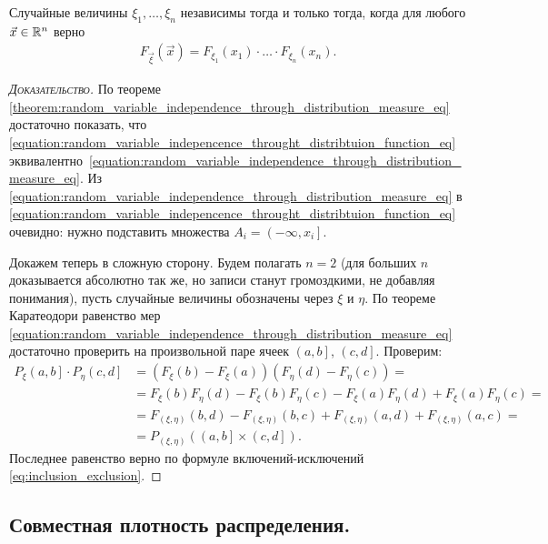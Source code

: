 \documentclass[../main.tex]{subfiles}
\begin{document}
\begin{crly}
 \label{corollary:inpendence_joint_F}
 Случайные величины $ \xi_1, \ldots, \xi_n $ независимы тогда и только тогда, когда для любого $ \vec x \in \mathbb{R}^{n} $ верно
 \begin{align}
  \label{equation:random_variable_indepencence_throught_distribtuion_function_eq}
  F_{\vec\xi}(\vec x) = F_{\xi_1}(x_1) \cdot\ldots\cdot F_{\xi_n}(x_n).
 \end{align} 
\end{crly}
\begin{proof}[\normalfont\textsc{Доказательство}]
 По теореме \ref{theorem:random_variable_independence_through_distribution_measure_eq} достаточно показать, что \eqref{equation:random_variable_indepencence_throught_distribtuion_function_eq} эквивалентно~\eqref{equation:random_variable_independence_through_distribution_measure_eq}. Из \eqref{equation:random_variable_independence_through_distribution_measure_eq} в \eqref{equation:random_variable_indepencence_throught_distribtuion_function_eq} очевидно: нужно подставить множества $ A_i = \left(-\infty, x_i\right]   $.

 Докажем теперь в сложную сторону. Будем полагать $ n = 2 $ (для больших $ n $ доказывается абсолютно так же, но записи станут громоздкими, не добавляя понимания), пусть случайные величины обозначены через $ \xi $ и $ \eta $. По теореме Каратеодори равенство мер \eqref{equation:random_variable_independence_through_distribution_measure_eq} достаточно проверить на произвольной паре ячеек $ \left(a, b\right]   $, $ \left(c, d\right] $. Проверим:
 \begin{align*}
  P_\xi \left(a, b\right] \cdot P_\eta \left(c, d\right] &= \left( F_\xi(b) - F_\xi(a) \right) \left( F_\eta(d) - F_\eta(c)  \right) = \\
  &= F_\xi(b)F_\eta(d) - F_\xi(b) F_\eta(c) - F_\xi(a) F_\eta(d) + F_\xi(a) F_\eta(c) = \\
  &= F_{(\xi,\eta)}(b, d) - F_{(\xi,\eta)}(b,c) + F_{(\xi,\eta)}(a,d) + F_{(\xi,\eta)}(a,c) = \\
  &= P_{(\xi,\eta)} \left( \left(a, b\right] \times \left(c, d\right]    \right).
 \end{align*} Последнее равенство верно по формуле включений-исключений \eqref{eq:inclusion_exclusion}.
\end{proof}

\subsection{Совместная плотность распределения.}
\end{document}
